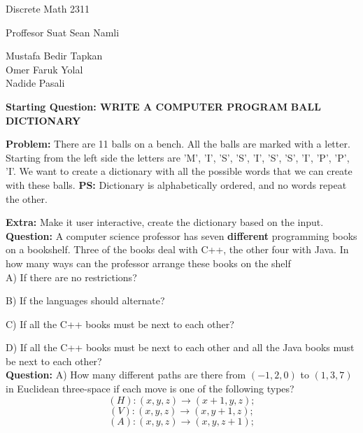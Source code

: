 \documentclass[11pt]{article}
\begin{document}
\begin{center}
Discrete Math 2311
\end{center}

\begin{center}
Proffesor Suat Sean Namli\\
\end{center}

\begin{center}
Mustafa Bedir Tapkan\\
Omer Faruk Yolal\\
Nadide Pasali\\
\end{center}

\newpage

\textbf{Starting Question: WRITE A COMPUTER PROGRAM} 
\textbf{BALL DICTIONARY}

\textbf{Problem:} There are 11 balls on a bench. All the balls are marked with a letter. Starting from the left side the letters are 'M', 'I', 'S', 'S', 'I', 'S', 'S', 'I', 'P', 'P', 'I'. We want to create a dictionary with all the possible words that we can create with these balls. %
 \textbf{PS:} Dictionary is alphabetically ordered, and no words repeat the other. %

\textbf{Extra:} Make it user interactive, create the dictionary based on the input.
\\

\textbf{Question:}  A computer science professor has seven \textbf{different} programming books on a bookshelf. Three of the books deal with C++, the other four with Java. In how many ways can the professor arrange these books on the shelf\\  %

A) If there are no restrictions?

B) If the languages should alternate?

C) If all the C++ books must be next to each other?

D) If all the C++ books must be next to each other and all the Java books must be next to each other?
\\

\textbf{Question:}  A) How many different paths are there from $(-1,2,0)$ to $(1,3,7)$ in Euclidean three-space if each move is one of the following types? %
$$(H):(x,y,z)\rightarrow(x+1,y,z);$$
$$(V):(x,y,z)\rightarrow(x,y+1,z);$$
$$(A):(x,y,z)\rightarrow(x,y,z+1);$$
\end{document}
